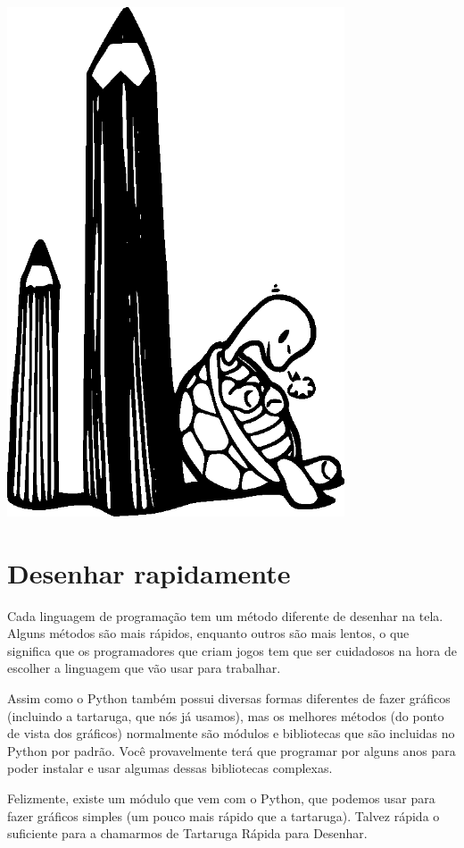 \begin{center}
\includegraphics*[width=100mm]{eps/turtle1.eps}
\end{center}

\section{Desenhar rapidamente}

Cada linguagem de programação tem um método diferente de desenhar na tela. Alguns métodos são mais rápidos, enquanto outros são mais lentos, o que significa que os programadores que criam jogos tem que ser cuidadosos na hora de escolher a linguagem que vão usar para trabalhar.
\par
Assim como o Python também possui diversas formas diferentes de fazer gráficos (incluindo a tartaruga, que nós já usamos), mas os melhores métodos (do ponto de vista dos gráficos) normalmente são módulos e bibliotecas que são incluidas no Python por padrão. Você provavelmente terá que programar por alguns anos para poder instalar e usar algumas dessas bibliotecas complexas.

Felizmente, existe um módulo que vem com o Python, que podemos usar para fazer gráficos simples (um pouco mais rápido que a tartaruga). Talvez rápida o suficiente para a chamarmos de Tartaruga Rápida para Desenhar.

